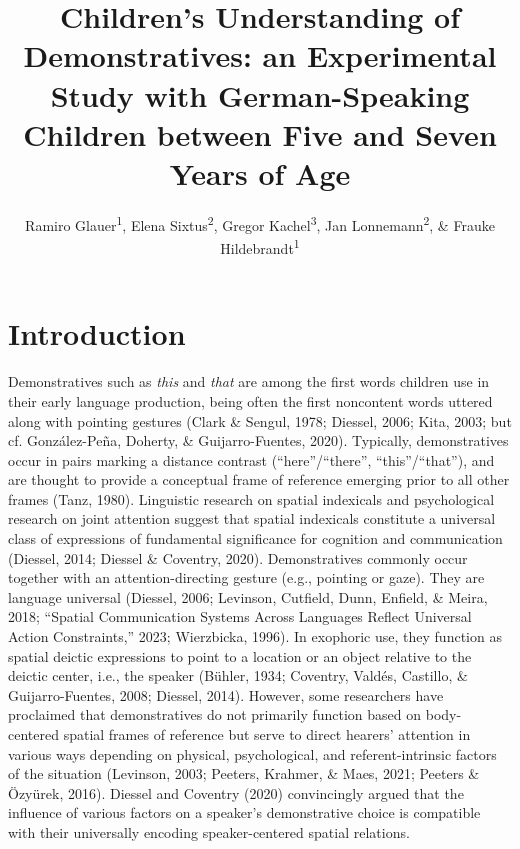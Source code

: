 \documentclass[
  man,floatsintext]{apa6}
\title{Children's Understanding of Demonstratives: an Experimental Study with German-Speaking Children between Five and Seven Years of Age}
\author{Ramiro Glauer\textsuperscript{1}, Elena Sixtus\textsuperscript{2}, Gregor Kachel\textsuperscript{3}, Jan Lonnemann\textsuperscript{2}, \& Frauke Hildebrandt\textsuperscript{1}}
\date{}
\affiliation{\vspace{0.5cm}\textsuperscript{1} Social and Educational Sciences Department, University of Applied Sciences Potsdam\\\textsuperscript{2} Empirical Childhood Research, University of Potsdam\\\textsuperscript{3} Leipzig University}
\begin{document}
\maketitle

\section{Introduction}\label{introduction}

Demonstratives such as \emph{this} and \emph{that} are among the first words children use in their early language production, being often the first noncontent words uttered along with pointing gestures (Clark \& Sengul, 1978; Diessel, 2006; Kita, 2003; but cf. González-Peña, Doherty, \& Guijarro-Fuentes, 2020). Typically, demonstratives occur in pairs marking a distance contrast (``here''/``there'', ``this''/``that''), and are thought to provide a conceptual frame of reference emerging prior to all other frames (Tanz, 1980). Linguistic research on spatial indexicals and psychological research on joint attention suggest that spatial indexicals constitute a universal class of expressions of fundamental significance for cognition and communication (Diessel, 2014; Diessel \& Coventry, 2020). Demonstratives commonly occur together with an attention-directing gesture (e.g., pointing or gaze). They are language universal (Diessel, 2006; Levinson, Cutfield, Dunn, Enfield, \& Meira, 2018; {``Spatial Communication Systems Across Languages Reflect Universal Action Constraints,''} 2023; Wierzbicka, 1996). In exophoric use, they function as spatial deictic expressions to point to a location or an object relative to the deictic center, i.e., the speaker (Bühler, 1934; Coventry, Valdés, Castillo, \& Guijarro-Fuentes, 2008; Diessel, 2014). However, some researchers have proclaimed that demonstratives do not primarily function based on body-centered spatial frames of reference but serve to direct hearers' attention in various ways depending on physical, psychological, and referent-intrinsic factors of the situation (Levinson, 2003; Peeters, Krahmer, \& Maes, 2021; Peeters \& Özyürek, 2016). Diessel and Coventry (2020) convincingly argued that the influence of various factors on a speaker's demonstrative choice is compatible with their universally encoding speaker-centered spatial relations.
\end{document}
